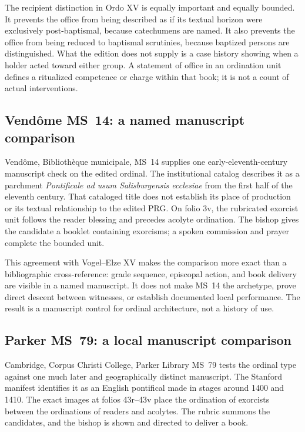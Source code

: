 The recipient distinction in Ordo XV is equally important and equally
bounded. It prevents the office from being described as if its textual horizon
were exclusively post-baptismal, because catechumens are named. It also
prevents the office from being reduced to baptismal scrutinies, because
baptized persons are distinguished. What the edition does not supply is a
case history showing when a holder acted toward either group. A statement of
office in an ordination unit defines a ritualized competence or charge within
that book; it is not a count of actual interventions.

\subsection{Vendôme MS~14: a named manuscript comparison}

Vendôme, Bibliothèque municipale, MS~14 supplies one early-eleventh-century
manuscript check on the edited ordinal. The institutional catalog describes
it as a parchment \emph{Pontificale ad usum Salisburgensis ecclesiae} from the
first half of the eleventh century. That cataloged title does not establish its
place of production or its textual relationship to the edited PRG. On folio
3v, the rubricated exorcist unit follows the reader blessing and precedes
acolyte ordination. The bishop gives the candidate a booklet containing
exorcisms; a spoken commission and prayer complete the bounded unit.

This agreement with Vogel--Elze XV makes the comparison more exact than a
bibliographic cross-reference: grade sequence, episcopal action, and book
delivery are visible in a named manuscript. It does not make MS~14 the
archetype, prove direct descent between witnesses, or establish documented
local performance. The result is a manuscript control for ordinal
architecture, not a history of use.

\subsection{Parker MS~79: a local manuscript comparison}

Cambridge, Corpus Christi College, Parker Library MS~79 tests the ordinal type
against one much later and geographically distinct manuscript. The Stanford
manifest identifies it as an English pontifical made in stages around 1400 and
1410. The exact images at folios 43r--43v place the ordination of exorcists
between the ordinations of readers and acolytes. The rubric summons the
candidates, and the bishop is shown and directed to deliver a book.

